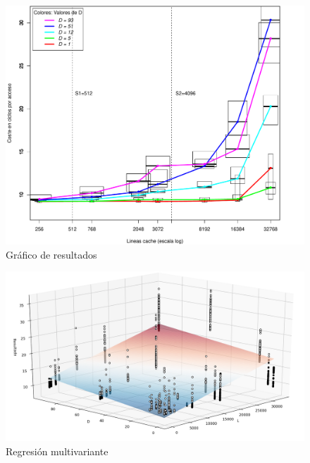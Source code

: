 \documentclass[letterpaper, 10 pt,spanish, conference]{ieeeconf}  %
\begin{document}
\begin{figure}
    \centering
    \includegraphics[scale=0.6]{theFile.pdf}
    \caption{Gráfico de resultados}
    \label{fig:g1}
\end{figure}

\begin{figure}
  \includegraphics[scale=0.4]{mvRegression.png}
  \centering
  \caption{Regresión multivariante}
  \label{fig:reg}
\end{figure}
\end{document}
